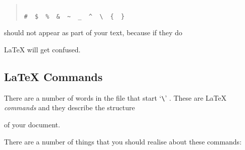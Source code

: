 \begin{quote}\begin{verbatim}

#  $  %  &  ~  _  ^  \  {  }

\end{verbatim}\end{quote}

should not appear as part of your text, because if they do

\LaTeX{} will get confused.



\subsection{\LaTeX{} Commands}



There are a number of words in the file that start `\verb|\|' .  These are \LaTeX{} {\em commands\/} and they describe the structure

of your document.

There are a number of things that you should realise about these commands:


